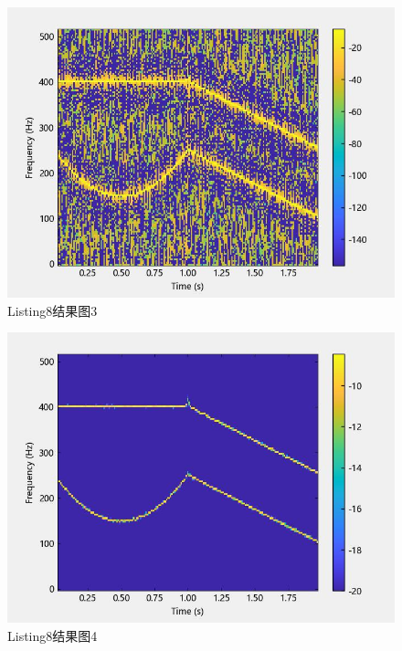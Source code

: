 \documentclass{article}
\begin{document}
	\begin{figure}[htbp]
		\centering
		\includegraphics{hw5(8)-3.jpeg}
		\caption{Listing8结果图3}
		\label{fig8-3}
	\end{figure}
	\begin{figure}[htbp]
		\centering
		\includegraphics{hw5(8)-4.jpeg}
		\caption{Listing8结果图4}
		\label{fig8-4}
	\end{figure}
	
\end{document}
